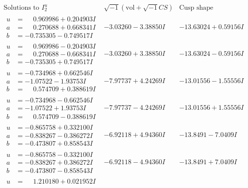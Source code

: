 \documentclass[1p]{elsarticle_modified}
\theoremstyle{definition}
\newcommand{\I}{\sqrt{-1}}
\begin{document}
$$\begin{array}{c|c|c}  
\text{Solutions to }I^u_{2}& \I (\text{vol} + \sqrt{-1}CS) & \text{Cusp shape}\\
 \hline 
\begin{aligned}
u &= \phantom{-}0.969986 + 0.204903 I \\
a &= \phantom{-}0.270688 + 0.668341 I \\
b &= -0.735305 - 0.749517 I\end{aligned}
 & -3.03260 - 3.38850 I & -13.63024 + 0.59156 I \\ \hline\begin{aligned}
u &= \phantom{-}0.969986 - 0.204903 I \\
a &= \phantom{-}0.270688 - 0.668341 I \\
b &= -0.735305 + 0.749517 I\end{aligned}
 & -3.03260 + 3.38850 I & -13.63024 - 0.59156 I \\ \hline\begin{aligned}
u &= -0.734968 + 0.662546 I \\
a &= -1.07522 - 1.93753 I \\
b &= \phantom{-}0.574709 + 0.388619 I\end{aligned}
 & -7.97737 + 4.24269 I & -13.01556 - 1.55556 I \\ \hline\begin{aligned}
u &= -0.734968 - 0.662546 I \\
a &= -1.07522 + 1.93753 I \\
b &= \phantom{-}0.574709 - 0.388619 I\end{aligned}
 & -7.97737 - 4.24269 I & -13.01556 + 1.55556 I \\ \hline\begin{aligned}
u &= -0.865758 + 0.332100 I \\
a &= -0.838267 - 0.386272 I \\
b &= -0.473807 + 0.858543 I\end{aligned}
 & -6.92118 + 4.94360 I & -13.8491 - 7.0409 I \\ \hline\begin{aligned}
u &= -0.865758 - 0.332100 I \\
a &= -0.838267 + 0.386272 I \\
b &= -0.473807 - 0.858543 I\end{aligned}
 & -6.92118 - 4.94360 I & -13.8491 + 7.0409 I \\ \hline\begin{aligned}
u &= \phantom{-}1.210180 + 0.021952 I \\

\end{aligned}
\end{array}$$
\end{document}
